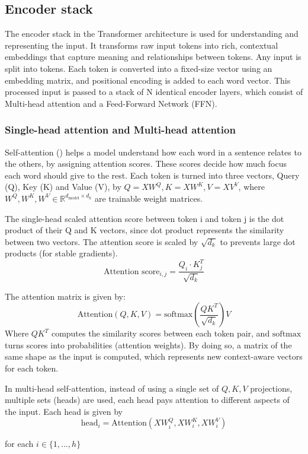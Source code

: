 \documentclass{article} %
\begin{document}
\subsection{Encoder stack}
The encoder stack in the Transformer architecture is used for understanding and representing the input. It transforms raw input tokens into rich, contextual embeddings that capture meaning and relationships between tokens. 
Any input is split into tokens. Each token is converted into a fixed-size vector using an embedding matrix, and positional encoding is added to each word vector. This processed input is passed to a stack of N identical encoder layers, which consist of Multi-head attention and a Feed-Forward Network (FFN). 

\subsubsection{Single-head attention and Multi-head attention}
Self-attention (\cite{liu2021multihead_vs_single}) helps a model understand how each word in a sentence relates to the others, by assigning attention scores. These scores decide how much focus each word should give to the rest.
Each token is turned into three vectors, Query (Q), Key (K) and Value (V), by $
Q = XW^Q, K=XW^K, V=XV^V
$, where \( W^Q, W^K, W^V \in \mathbb{R}^{d_{\text{model}} \times d_k} \) are trainable weight matrices.

The single-head scaled attention score between token i and token j is the dot product of their Q and K vectors, since dot product represents the similarity between two vectors. The attention score is scaled by $\sqrt{d_k}$ to prevents large dot products (for stable gradients).
\[
\text{Attention score}_{i,j} = \frac{Q_i \cdot K_j^T}{\sqrt{d_k}}
\]

The attention matrix is given by:
\[
\text{Attention}(Q, K, V) = \text{softmax} \left( \frac{QK^T}{\sqrt{d_k}} \right) V
\]
Where $QK^T$ computes the similarity scores between each token pair, and $\text{softmax}$ turns scores into probabilities (attention weights). By doing so, a matrix of the same shape as the input is computed, which represents new context-aware vectors for each token.

In multi-head self-attention, instead of using a single set of $Q, K, V$ projections, multiple sets (heads) are used, each head pays attention to different aspects of the input. Each head is given by
 \[
\text{head}_i = \text{Attention}(XW_i^Q, XW_i^K, XW_i^V)
    \]
    
for each \( i \in \{1, \dots, h\} \)
    
\end{document}
